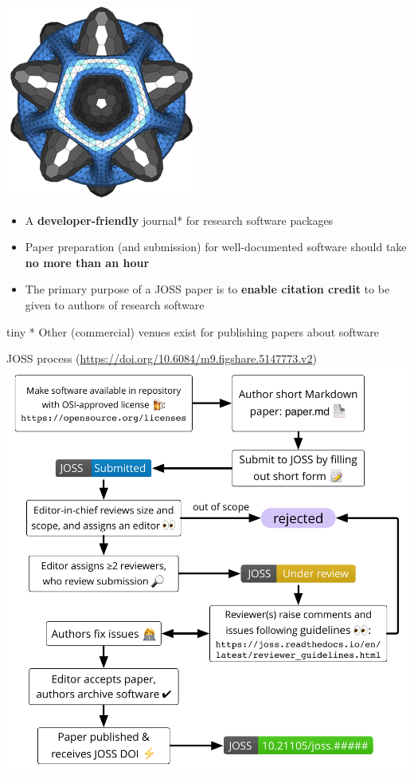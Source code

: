 \begin{frame}
  \includegraphics[scale=0.5]{joss.png}      
\vspace{1cm}
\begin{itemize}
    \item A \textbf{developer-friendly} journal* for research software
packages
    \item Paper preparation (and submission) for well-documented
software should take \textbf{no more than an hour}
\item The primary purpose of a JOSS paper is to \textbf{enable citation
credit} to be given to authors of research software
\end{itemize}

\vspace{2cm}

{tiny * Other (commercial) venues exist for publishing papers about software}
\end{frame}

    
\begin{frame}{JOSS process {\tiny(\url{https://doi.org/10.6084/m9.figshare.5147773.v2})}}
    \centering
    \includegraphics[scale=0.5]{JOSS-flowchart-updated.pdf}
\end{frame}

